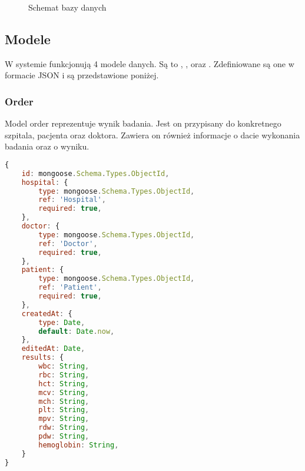 \documentclass{documentation}
\begin{document}
\begin{figure}[h!]
    \caption{Schemat bazy danych\label{fig:db}}
\end{figure}

\subsection{Modele}

W systemie funkcjonują 4 modele danych.
Są to , ,  oraz .
Zdefiniowane są one w formacie JSON i są przedstawione poniżej.

\subsubsection{Order}

Model order reprezentuje wynik badania.
Jest on przypisany do konkretnego szpitala, pacjenta oraz doktora.
Zawiera on również informacje o dacie wykonania badania oraz o wyniku.

\begin{lstlisting}[language=JavaScript]
{
    id: mongoose.Schema.Types.ObjectId,
    hospital: {
        type: mongoose.Schema.Types.ObjectId,
        ref: 'Hospital',
        required: true,
    },
    doctor: {
        type: mongoose.Schema.Types.ObjectId,
        ref: 'Doctor',
        required: true,
    },
    patient: {
        type: mongoose.Schema.Types.ObjectId,
        ref: 'Patient',
        required: true,
    },
    createdAt: {
        type: Date,
        default: Date.now,
    },
    editedAt: Date,
    results: {
        wbc: String,
        rbc: String,
        hct: String,
        mcv: String,
        mch: String,
        plt: String,
        mpv: String,
        rdw: String,
        pdw: String,
        hemoglobin: String,
    }
}
\end{lstlisting}
\end{document}
